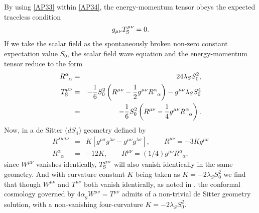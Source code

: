 % 
By using \eqref{AP33} within \eqref{AP34}, the energy-momentum tensor obeys the expected traceless condition
\begin{eqnarray}
g_{\mu\nu}T_{\rm S}^{\mu\nu}=0.
\end{eqnarray}
%
If we take the scalar field as the spontaneously broken non-zero constant expectation value $S_0$, the scalar field wave equation and the energy-momentum tensor reduce to the form
%                                                                               
\begin{eqnarray}
R^\alpha_{\phantom{\alpha}\alpha}&=&24\lambda_S S_0^2,
\nonumber\\
T_{\rm S}^{\mu \nu}&=& 
-\frac{1}{6} S_0^2\left(R^{\mu\nu}-\frac{1}{2}g^{\mu\nu}
R^\alpha_{\phantom{\alpha}\alpha}\right)-g^{\mu\nu}\lambda_S S_0^4
\nonumber\\
&=&-\frac{1}{6} S_0^2\left(R^{\mu\nu}-\frac{1}{4}g^{\mu\nu}
R^\alpha_{\phantom{\alpha}\alpha}\right).
\label{AP35}
\end{eqnarray}                                 
%  
Now, in a de Sitter ($dS_4$) geometry defined by
\begin{eqnarray}
R^{\lambda\mu\sigma\nu}&=&K[g^{\mu \sigma}g^{\lambda \nu}-g^{\mu \nu}g^{\lambda \sigma}],\qquad R^{\mu\nu}=-3Kg^{\mu\nu}
\nonumber\\
R^\alpha_{\phantom{\alpha}\alpha}&=&-12K,\qquad R^{\mu\nu}=(1/4)g^{\mu\nu}
R^\alpha_{\phantom{\alpha}\alpha},
\end{eqnarray}
since $W^{\mu \nu}$ vanishes identically, $T_{\rm S}^{\mu \nu}$ will also  vanish identically in the same geometry. And with curvature constant $K$ being taken as $K=-2\lambda_S S_0^2$ we find that though $W^{\mu\nu}$ and $T^{\mu\nu}$ both vanish identically, as noted in \cite{mannheim_1990}, the conformal cosmology governed by $4\alpha_gW^{\mu\nu}=T^{\mu\nu}$ admits of a non-trivial de Sitter geometry solution, with a non-vanishing four-curvature $K=-2\lambda_S S_0^2$.

